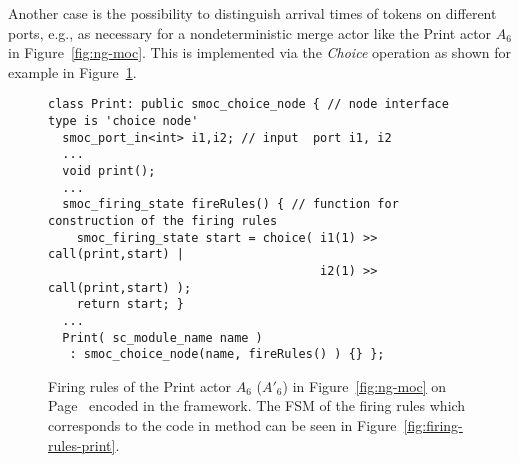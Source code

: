 Another case is the possibility to distinguish arrival times of tokens on
different ports, e.g., as necessary for a nondeterministic
merge actor like the Print actor $A_6$ in Figure~\ref{fig:ng-moc}.
This is implemented via the \emph{Choice} operation as shown
for example in Figure~\ref{systemoc-firing-rules-print}.

\begin{figure}[t]
\centering
\begin{verbatim}
class Print: public smoc_choice_node { // node interface type is 'choice node'
  smoc_port_in<int> i1,i2; // input  port i1, i2
  ...
  void print();
  ...
  smoc_firing_state fireRules() { // function for construction of the firing rules
    smoc_firing_state start = choice( i1(1) >> call(print,start) |
                                      i2(1) >> call(print,start) );
    return start; }
  ...
  Print( sc_module_name name )
   : smoc_choice_node(name, fireRules() ) {} };
\end{verbatim}
\caption{\label{systemoc-firing-rules-print}Firing rules
of the Print actor $A_6$ ($A'_6$) in Figure~\ref{fig:ng-moc} on Page~\pageref{fig:ng-moc}  encoded
in the \SysteMoC{} framework. The FSM of the firing rules which corresponds to the code in
method  can be seen in Figure~\ref{fig:firing-rules-print}.}
\end{figure}

